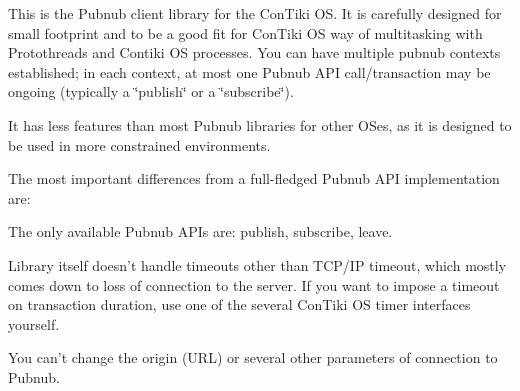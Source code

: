 This is the Pubnub client library for the Con\-Tiki O\-S. It is carefully designed for small footprint and to be a good fit for Con\-Tiki O\-S way of multitasking with Protothreads and Contiki O\-S processes. You can have multiple pubnub contexts established; in each context, at most one Pubnub A\-P\-I call/transaction may be ongoing (typically a \char`\"{}publish\char`\"{} or a \char`\"{}subscribe\char`\"{}).

It has less features than most Pubnub libraries for other O\-Ses, as it is designed to be used in more constrained environments.

The most important differences from a full-\/fledged Pubnub A\-P\-I implementation are\-:


\begin{DoxyItemize}
\item The only available Pubnub A\-P\-Is are\-: publish, subscribe, leave.
\item Library itself doesn't handle timeouts other than T\-C\-P/\-I\-P timeout, which mostly comes down to loss of connection to the server. If you want to impose a timeout on transaction duration, use one of the several Con\-Tiki O\-S timer interfaces yourself.
\item You can't change the origin (U\-R\-L) or several other parameters of connection to Pubnub. 
\end{DoxyItemize}